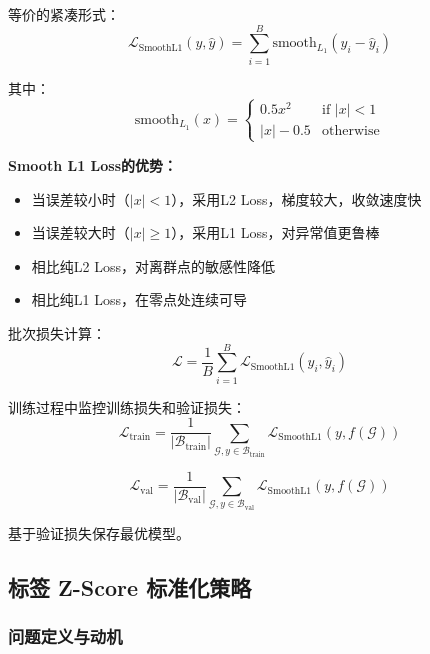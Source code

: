 \documentclass[UTF8, a4paper, 12pt]{article}
\begin{document}
等价的紧凑形式：
\begin{equation}
\mathcal{L}_{\text{SmoothL1}}(y, \hat{y}) = \sum_{i=1}^{B} \text{smooth}_{L_1}(y_i - \hat{y}_i)
\end{equation}

其中：
\begin{equation}
\text{smooth}_{L_1}(x) = \begin{cases}
0.5 x^2 & \text{if } |x| < 1 \\
|x| - 0.5 & \text{otherwise}
\end{cases}
\end{equation}

\textbf{Smooth L1 Loss的优势：}
\begin{itemize}
    \item 当误差较小时（$|x| < 1$），采用L2 Loss，梯度较大，收敛速度快
    \item 当误差较大时（$|x| \geq 1$），采用L1 Loss，对异常值更鲁棒
    \item 相比纯L2 Loss，对离群点的敏感性降低
    \item 相比纯L1 Loss，在零点处连续可导
\end{itemize}

批次损失计算：
\begin{equation}
\mathcal{L} = \frac{1}{B} \sum_{i=1}^{B} \mathcal{L}_{\text{SmoothL1}}(y_i, \hat{y}_i)
\end{equation}

训练过程中监控训练损失和验证损失：
\begin{equation}
\mathcal{L}_{\text{train}} = \frac{1}{|\mathcal{B}_{\text{train}}|} \sum_{\mathcal{G}, y \in \mathcal{B}_{\text{train}}} \mathcal{L}_{\text{SmoothL1}}(y, f(\mathcal{G}))
\end{equation}

\begin{equation}
\mathcal{L}_{\text{val}} = \frac{1}{|\mathcal{B}_{\text{val}}|} \sum_{\mathcal{G}, y \in \mathcal{B}_{\text{val}}} \mathcal{L}_{\text{SmoothL1}}(y, f(\mathcal{G}))
\end{equation}

基于验证损失保存最优模型。

\subsection{标签 Z-Score 标准化策略}

\subsubsection{问题定义与动机}
\end{document}
